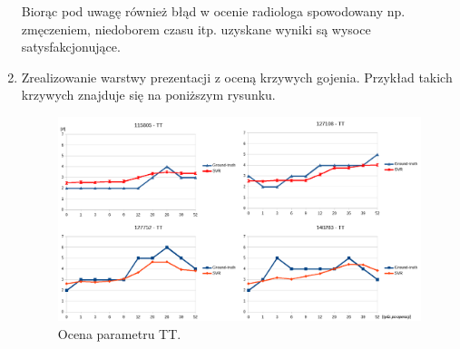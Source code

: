\begin{enumerate}
	Biorąc pod uwagę również błąd w ocenie radiologa spowodowany np. zmęczeniem, niedoborem czasu itp. uzyskane wyniki są wysoce satysfakcjonujące.
	\item Zrealizowanie warstwy prezentacji z oceną krzywych gojenia. Przykład takich krzywych znajduje się na poniższym rysunku.
	 \begin{figure}[h!]
	 	\centering
	 	\includegraphics[width=1\textwidth]{figures/TT.png}
	 	\caption{Ocena parametru TT.}\label{fig:TT}
	 \end{figure}
 

\end{enumerate}
